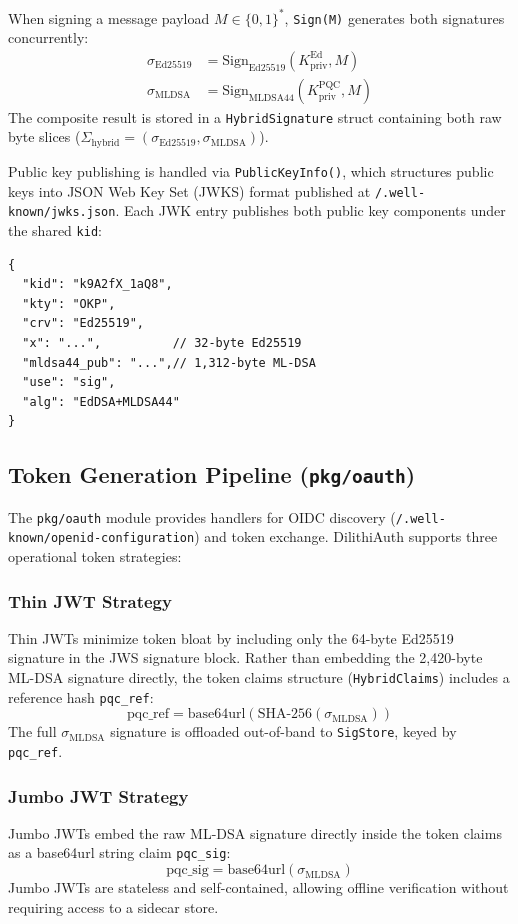 \documentclass[conference]{IEEEtran}
\begin{document}
When signing a message payload $M \in \{0,1\}^*$, \texttt{Sign(M)} generates both signatures concurrently:
\begin{align}
\sigma_{\text{Ed25519}} &= \text{Sign}_{\text{Ed25519}}(K_{\text{priv}}^{\text{Ed}}, M) \\
\sigma_{\text{MLDSA}} &= \text{Sign}_{\text{MLDSA44}}(K_{\text{priv}}^{\text{PQC}}, M)
\end{align}
The composite result is stored in a \texttt{HybridSignature} struct containing both raw byte slices ($\Sigma_{\text{hybrid}} = (\sigma_{\text{Ed25519}}, \sigma_{\text{MLDSA}})$).

Public key publishing is handled via \texttt{PublicKeyInfo()}, which structures public keys into JSON Web Key Set (JWKS) format published at \texttt{/.well-known/jwks.json}. Each JWK entry publishes both public key components under the shared \texttt{kid}:
{\small
\begin{verbatim}
{
  "kid": "k9A2fX_1aQ8",
  "kty": "OKP",
  "crv": "Ed25519",
  "x": "...",          // 32-byte Ed25519
  "mldsa44_pub": "...",// 1,312-byte ML-DSA
  "use": "sig",
  "alg": "EdDSA+MLDSA44"
}
\end{verbatim}
}

\subsection{Token Generation Pipeline (\texttt{pkg/oauth})}
The \texttt{pkg/oauth} module provides handlers for OIDC discovery (\texttt{/.well-known/openid-configuration}) and token exchange. DilithiAuth supports three operational token strategies:

\subsubsection{Thin JWT Strategy}
Thin JWTs minimize token bloat by including only the 64-byte Ed25519 signature in the JWS signature block. Rather than embedding the 2,420-byte ML-DSA signature directly, the token claims structure (\texttt{HybridClaims}) includes a reference hash \texttt{pqc\_ref}:
\begin{equation}
\text{pqc\_ref} = \text{base64url}\left(\text{SHA-256}(\sigma_{\text{MLDSA}})\right)
\end{equation}
The full $\sigma_{\text{MLDSA}}$ signature is offloaded out-of-band to \texttt{SigStore}, keyed by \texttt{pqc\_ref}.

\subsubsection{Jumbo JWT Strategy}
Jumbo JWTs embed the raw ML-DSA signature directly inside the token claims as a base64url string claim \texttt{pqc\_sig}:
\begin{equation}
\text{pqc\_sig} = \text{base64url}(\sigma_{\text{MLDSA}})
\end{equation}
Jumbo JWTs are stateless and self-contained, allowing offline verification without requiring access to a sidecar store.
\end{document}
